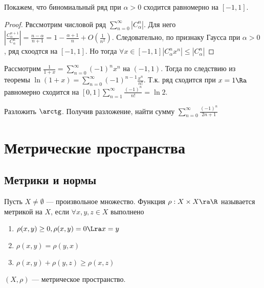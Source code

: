 \begin{note}
    Покажем, что биномиальный ряд при \(\alpha > 0\) сходится равномерно на \([-1, 1]\).
\end{note}
\begin{proof}
    Рвссмотрим числовой ряд \(\sum_{n = 0}^\infty\left|C_\alpha^n\right|\). Для него \(\left|\frac{C_\alpha^{n + 1}}{C_\alpha^n}\right| = \frac{n - \alpha}{n + 1} = 1 - \frac{\alpha + 1}{n} + O\left(\frac{1}{n^2}\right)\). Следовательно, по признаку Гаусса при \(\alpha > 0\), ряд схоодтся на \([-1, 1]\). Но тогда \(\forall x \in [-1, 1] |C_\alpha^nx^n| \le |C_\alpha^n|\)
\end{proof}

\begin{example}
    Рассмотрим \(\frac{1}{1 + x} = \sum_{n = 0}^\infty (-1)^nx^n\) на \((-1, 1)\). Тогда по следствию из теоремы \(\ln(1 + x) = \sum_{n = 0}^\infty (-1)^{n - 1}\frac{x^n}{n!}\). Т.к. ряд сходится при \(x = 1 \Ra \) равномерно сходится на \([0, 1] \sum_{n = 1}^\infty \frac{(-1)^n}{n!} = \ln 2\).
\end{example}

\begin{problem}
    Разложить \(\arctg\). Получив разложение, найти сумму \(\sum_{n = 0}^\infty \frac{(-1)^n}{2n + 1}\)
\end{problem}

\section{Метрические пространства}
\subsection{Метрики и нормы}
\begin{definition}
    Пусть \(X \ne \emptyset\) --- произвольное множество. Функция \(\rho: X \times X \ra \R\) называется метрикой на \(X\), если \(\forall x, y, z \in X\) выполнено
    \begin{enumerate}
        \item \(\rho(x, y) \ge 0, \rho(x, y) = 0 \Lra x = y\)
        \item \(\rho(x, y) = \rho(y, x)\)
        \item \(\rho(x, y) + \rho(y, z) \ge \rho(x, z)\)
    \end{enumerate}
\end{definition}
\begin{definition}
    \((X, \rho)\) --- метрическое пространство.
\end{definition}

